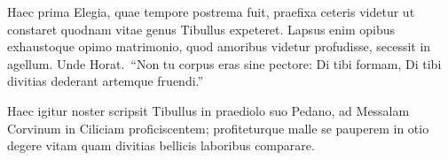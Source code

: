 
Haec prima Elegia, quae tempore postrema fuit, praefixa ceteris videtur ut constaret quodnam vitae genus Tibullus expeteret. Lapsus enim opibus exhaustoque opimo matrimonio, quod amoribus videtur profudisse, secessit in agellum. Unde Horat.\ ``Non tu corpus eras sine pectore: Di tibi formam, Di tibi divitias dederant artemque fruendi.'' 

Haec igitur noster scripsit Tibullus in praediolo suo Pedano, ad Messalam Corvinum in Ciliciam proficiscentem; profiteturque malle se pauperem in otio degere vitam quam divitias bellicis laboribus comparare.






